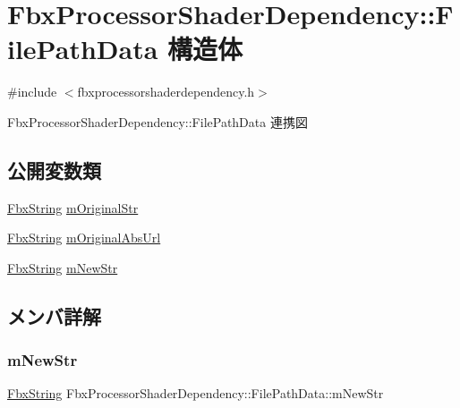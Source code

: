 \hypertarget{struct_fbx_processor_shader_dependency_1_1_file_path_data}{}\section{Fbx\+Processor\+Shader\+Dependency\+:\+:File\+Path\+Data 構造体}
\label{struct_fbx_processor_shader_dependency_1_1_file_path_data}


{\ttfamily \#include $<$fbxprocessorshaderdependency.\+h$>$}



Fbx\+Processor\+Shader\+Dependency\+:\+:File\+Path\+Data 連携図
\subsection*{公開変数類}
\begin{DoxyCompactItemize}
\item 
\hyperlink{class_fbx_string}{Fbx\+String} \hyperlink{struct_fbx_processor_shader_dependency_1_1_file_path_data_aa8e2a65dd054c34298e4c94e97e25a7d}{m\+Original\+Str}
\item 
\hyperlink{class_fbx_string}{Fbx\+String} \hyperlink{struct_fbx_processor_shader_dependency_1_1_file_path_data_a928d771cfe786eb2d62c4d01f4b39e67}{m\+Original\+Abs\+Url}
\item 
\hyperlink{class_fbx_string}{Fbx\+String} \hyperlink{struct_fbx_processor_shader_dependency_1_1_file_path_data_a18b0e38f5eb481ea90bdbf313dba9ec6}{m\+New\+Str}
\end{DoxyCompactItemize}


\subsection{メンバ詳解}
\mbox{\label{struct_fbx_processor_shader_dependency_1_1_file_path_data_a18b0e38f5eb481ea90bdbf313dba9ec6}} 
\subsubsection{\texorpdfstring{m\+New\+Str}{mNewStr}}
{\footnotesize\ttfamily \hyperlink{class_fbx_string}{Fbx\+String} Fbx\+Processor\+Shader\+Dependency\+::\+File\+Path\+Data\+::m\+New\+Str}

